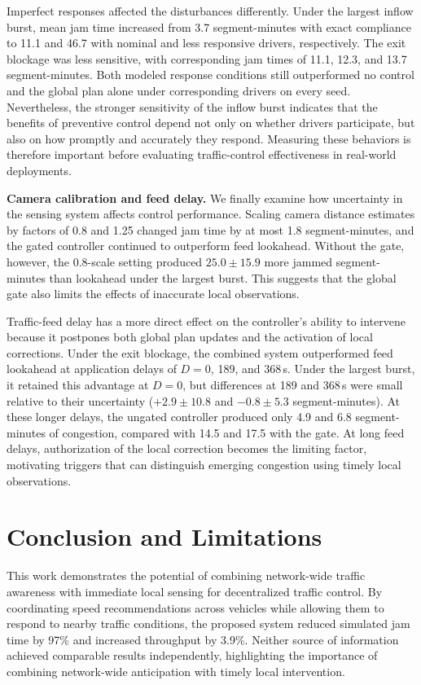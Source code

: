 \documentclass[letterpaper, 10pt, journal, twoside]{IEEEtran}
\begin{document}
Imperfect responses affected the disturbances differently. Under the largest inflow burst, mean jam time increased from 3.7 segment-minutes with exact compliance to 11.1 and 46.7 with nominal and less responsive drivers, respectively. The exit blockage was less sensitive, with corresponding jam times of 11.1, 12.3, and 13.7 segment-minutes. Both modeled response conditions still outperformed no control and the global plan alone under corresponding drivers on every seed. Nevertheless, the stronger sensitivity of the inflow burst indicates that the benefits of preventive control depend not only on whether drivers participate, but also on how promptly and accurately they respond. Measuring these behaviors is therefore important before evaluating traffic-control effectiveness in real-world deployments.

\noindent\textbf{Camera calibration and feed delay.} We finally examine how uncertainty in the sensing system affects control performance. Scaling camera distance estimates by factors of 0.8 and 1.25 changed jam time by at most 1.8 segment-minutes, and the gated controller continued to outperform feed lookahead. Without the gate, however, the 0.8-scale setting produced $25.0\pm15.9$ more jammed segment-minutes than lookahead under the largest burst. This suggests that the global gate also limits the effects of inaccurate local observations.

Traffic-feed delay has a more direct effect on the controller's ability to intervene because it postpones both global plan updates and the activation of local corrections. Under the exit blockage, the combined system outperformed feed lookahead at application delays of $D=0$, 189, and 368\,s. Under the largest burst, it retained this advantage at $D=0$, but differences at 189 and 368\,s were small relative to their uncertainty ($+2.9\pm10.8$ and $-0.8\pm5.3$ segment-minutes). At these longer delays, the ungated controller produced only 4.9 and 6.8 segment-minutes of congestion, compared with 14.5 and 17.5 with the gate. At long feed delays, authorization of the local correction becomes the limiting factor, motivating triggers that can distinguish emerging congestion using timely local observations.

\section{Conclusion and Limitations}

\label{sec:conclusion}

This work demonstrates the potential of combining network-wide traffic awareness with immediate local sensing for decentralized traffic control. By coordinating speed recommendations across vehicles while allowing them to respond to nearby traffic conditions, the proposed system reduced simulated jam time by 97\% and increased throughput by 3.9\%. Neither source of information achieved comparable results independently, highlighting the importance of combining network-wide anticipation with timely local intervention.
\end{document}
